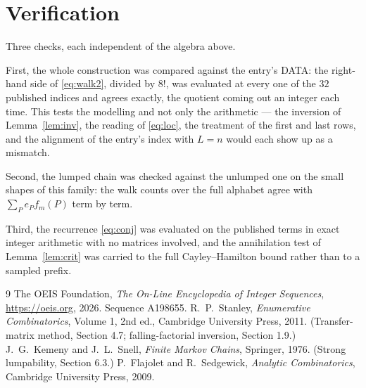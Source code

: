 \documentclass[11pt,a4paper]{article}
\theoremstyle{plain}
\theoremstyle{definition}
\begin{document}
\section{Verification}

Three checks, each independent of the algebra above.

First, the whole construction was compared against the entry's DATA: the right-hand side of
\eqref{eq:walk2}, divided by $8!$, was evaluated at every one of the $32$
published indices and agrees exactly, the quotient coming out an integer each time. This
tests the modelling and not only the arithmetic --- the inversion of Lemma~\ref{lem:inv},
the reading of \eqref{eq:loc}, the treatment of the first and last rows, and the
alignment of the entry's index with $L=n$ would each show up as a mismatch.

Second, the lumped chain was checked against the unlumped one on the small shapes of this
family: the walk counts over the full alphabet agree with $\sum_P e_Pf_m(P)$ term by term.

Third, the recurrence \eqref{eq:conj} was evaluated on the published terms in exact integer
arithmetic with no matrices involved, and the annihilation test of Lemma~\ref{lem:crit} was
carried to the full Cayley--Hamilton bound rather than to a sampled prefix.

\begin{thebibliography}{9}
 The OEIS Foundation, \emph{The On-Line Encyclopedia of Integer
Sequences}, \url{https://oeis.org}, 2026. Sequence A198655.
 R.~P.~Stanley, \emph{Enumerative Combinatorics}, Volume 1, 2nd ed.,
Cambridge University Press, 2011. (Transfer-matrix method, Section 4.7; falling-factorial
inversion, Section 1.9.)
 J.~G.~Kemeny and J.~L.~Snell, \emph{Finite Markov Chains}, Springer,
1976. (Strong lumpability, Section 6.3.)
 P.~Flajolet and R.~Sedgewick, \emph{Analytic Combinatorics}, Cambridge
University Press, 2009.
\end{thebibliography}
\end{document}
